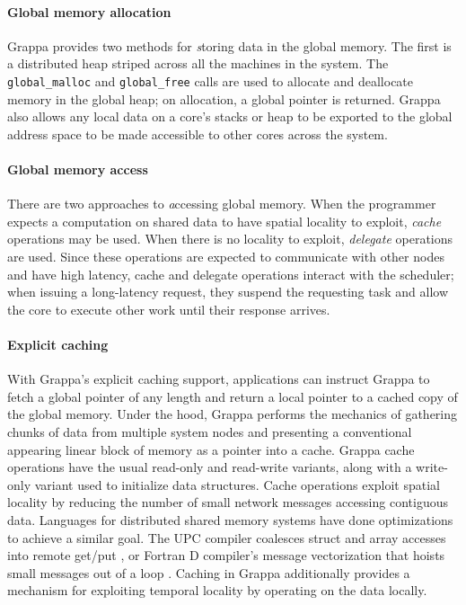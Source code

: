 \paragraph{Global memory allocation}
Grappa provides two methods for {\emph storing} data in the global memory. The
first is a distributed heap striped across all the machines in the
system. The \texttt{global\_malloc} and \texttt{global\_free} calls
are used to allocate and deallocate memory in the global heap; on
allocation, a global pointer is returned. Grappa also allows any local
data on a core's stacks or heap to be exported to the global address
space to be made accessible to other cores across the system.

\paragraph{Global memory access}
There are two approaches to {\emph accessing} global memory. When the
programmer expects a computation on shared data to have spatial
locality to exploit, {\em cache} operations may be used. When there is
no locality to exploit, {\em delegate} operations are used. Since
these operations are expected to communicate with other nodes and have
high latency, cache and delegate operations interact with the
scheduler; when issuing a long-latency request, they suspend the
requesting task and allow the core to execute other work until their
response arrives.

\paragraph{Explicit caching}
With Grappa's explicit caching support, applications can instruct Grappa to fetch a global
pointer of any length and return a local pointer to a cached copy of
the global memory. Under the hood, Grappa performs the mechanics of
gathering chunks of data from multiple system nodes and presenting a
conventional appearing linear block of memory as a pointer into a
cache. Grappa cache operations have the usual read-only and read-write
variants, along with a write-only variant used to initialize data
structures. Cache operations exploit spatial locality by reducing the number of small network
messages accessing contiguous data. Languages for distributed
shared memory systems have done optimizations to achieve a similar goal. The UPC compiler
coalesces struct and array accesses into 
remote get/put \cite{Chen:2005}, or Fortran D compiler's message
vectorization that hoists small messages out of a loop
\cite{FortranD:1992}. Caching in Grappa additionally provides a
mechanism for exploiting temporal locality by operating on the data locally. 

